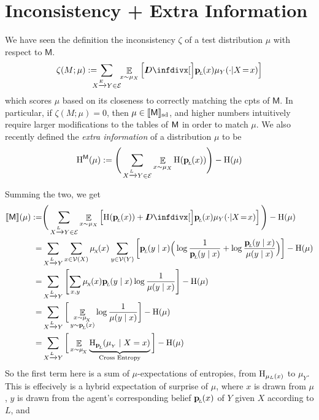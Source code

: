 \documentclass{article}
\newcommand{\bp}[1][L]{\mat{p}_{\!_#1\!}}
\newcommand{\V}{\mathcal V}
\newcommand{\Ed}{\mathcal E}
\newcommand{\sfM}{\mathsf M}
\newcommand\SD{_{\text{sd}}}
\begin{document}
	\section{Inconsistency + Extra Information}
	We have seen the definition the inconsistency $\zeta$ of a test distribution $\mu$ with respect to $\sfM$.
	\[
		\zeta(M ; \mu) := %
		\!\!\!\!\!\sum_{ X \xrightarrow{\!\!E} Y  \in \Ed }\!\! \mathop{\mathbb E}_{x \sim \mu_X} \left[\kldiv[\Big]{\bp(x) }{ \mu_Y(\cdot | X \!=\! x) } \right]
	\] 
	which scores $\mu$ based on its closeness to correctly matching the cpts of $\sfM$. In particular, if $\zeta(M;\mu) = 0$, then $\mu \in \bbr{\sfM}\SD$, and higher numbers intuitively require larger modifications to the tables of $\sf M$ in order to match $\mu$.     
	We also recently defined the \emph{extra information} of a distribution $\mu$ to be
	\[ \H^{\sfM}(\mu) := \Bigg(\sum_{ X \xrightarrow{\!\!L} Y  \in \Ed } \E_{x \sim \mu_X}  \H (\bp (x)) \Bigg) - \H(\mu) \] 
	
	Summing the two, we get 
	\begin{align*}
		 \bbr{\sfM}(\mu) :=& \Bigg(\sum_{ X \xrightarrow{\!\!L} Y  \in \Ed } \E_{x \sim \mu_X}  \left[ \H (\bp (x)) +\kldiv[\Big]{\bp(x) }{ \mu_Y(\cdot | X \!=\! x) }  \right] \Bigg) - \H(\mu) \\
		 =& \sum_{ X \xrightarrow{\!\!L} Y } \sum_{x \in \V(X)} \mu_{\!_X}\!(x) \sum_{y \in \V(Y)}  \left[ \bp (y\mid x) \Big(\log \frac{1}{\bp(y \mid x)} + \log \frac{\bp(y \mid x)}{\mu(y \mid x)}\Big)  \right]  - \H(\mu) \\
		 =& \sum_{ X \xrightarrow{\!\!L} Y} \left[ \sum_{x, y }   \mu_{\!_X}\!(x) \bp (y\mid x) \log \frac{1}{\mu(y \mid x)}  \right]  - \H(\mu) \\
		 =& \sum_{ X \xrightarrow{\!\!L} Y} \bigg[ \E_{\substack{x \sim \mu_{\!_X} \\[-0.0em] y \sim \bp(x)}} \log \frac{1}{\mu(y \mid x)}  \bigg]  - \H(\mu) \\
		 =& \sum_{ X \xrightarrow{\!\!L} Y} \bigg[ \E_{x \sim \mu_{\!_X}} \underbrace{ \H_{\bp} (\mu_{_Y} \mid X = x)}_{\text{Cross Entropy}}  \bigg]  - \H(\mu ) \\
	\end{align*}
	So the first term here is a sum of $\mu$-expectations of entropies, from $\mathrm{H}_{\mu_L(x)}$ to $\mu_Y$. 
	This is effecively is a hybrid expectation of surprise of $\mu$, where $x$ is drawn from $\mu$, $y$ is drawn from the agent's corresponding belief $\bp(x)$ of $Y$ given $X$ according to $L$, and  
	
\end{document}
